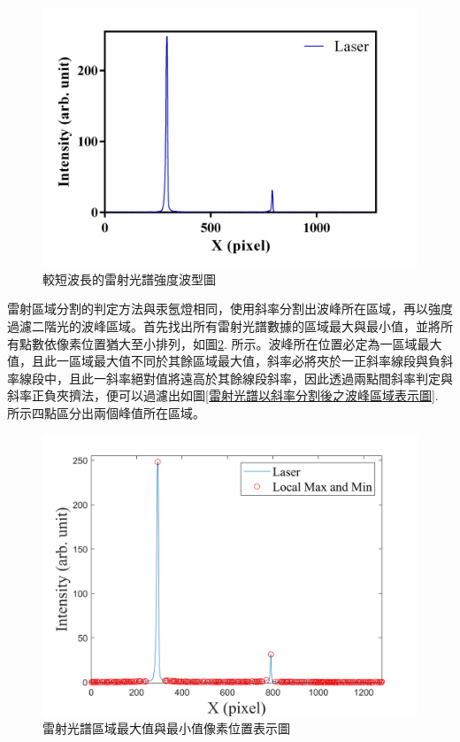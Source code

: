 \begin{figure}[H] %
	\centering %
	\vspace{0.8cm}
	\setlength{\abovecaptionskip}{0.cm}
	\includegraphics[width=\textwidth]{figures/Laser_1.png} %
	\caption{較短波長的雷射光譜強度波型圖} %
	\label{較短波長的雷射光譜強度波型圖} %
\end{figure}
雷射區域分割的判定方法與汞氬燈相同，使用斜率分割出波峰所在區域，再以強度過濾二階光的波峰區域。首先找出所有雷射光譜數據的區域最大與最小值，並將所有點數依像素位置猶大至小排列，如圖\ref{雷射光譜區域最大值與最小值像素位置表示圖}. 所示。波峰所在位置必定為一區域最大值，且此一區域最大值不同於其餘區域最大值，斜率必將夾於一正斜率線段與負斜率線段中，且此一斜率絕對值將遠高於其餘線段斜率，因此透過兩點間斜率判定與斜率正負夾擠法，便可以過濾出如圖\ref{雷射光譜以斜率分割後之波峰區域表示圖}. 所示四點區分出兩個峰值所在區域。
\begin{figure}[H] %
	\centering %
	\includegraphics[width=14.5cm]{figures/LASER_MIN_MAX.png} %
	\caption{雷射光譜區域最大值與最小值像素位置表示圖} %
	\label{雷射光譜區域最大值與最小值像素位置表示圖} %
\end{figure}

